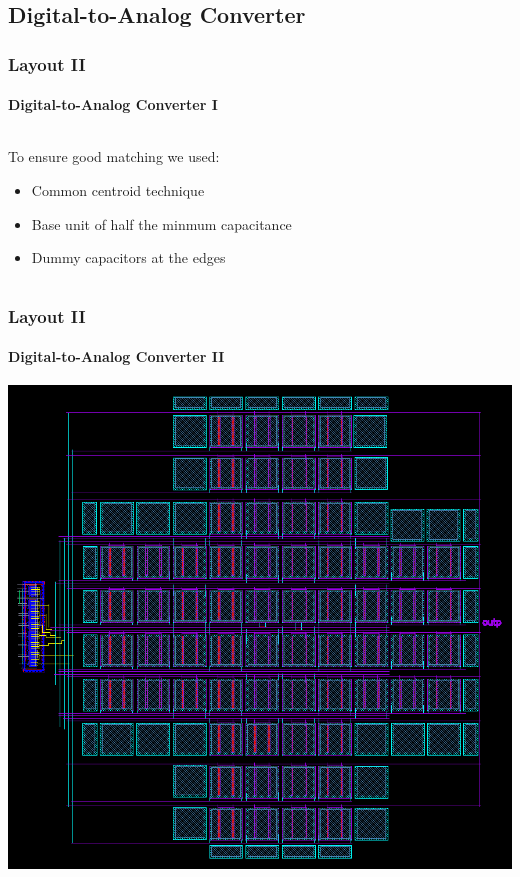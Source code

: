 \documentclass{beamer}
\begin{document}
  \subsection{Digital-to-Analog Converter}
  \begin{frame}
    \frametitle{Layout II}
    \framesubtitle{Digital-to-Analog Converter I}
    \begin{columns}
    \begin{column}{0.40\linewidth}
    To ensure good matching we used: 
    \begin{itemize}
    \item Common centroid technique
    \item<2-> Base unit of half the minmum capacitance
    \item<3-> Dummy capacitors at the edges
    \end{itemize}
    \vspace{3em}
    \end{column}
    \begin{column}{0.60\linewidth}
    \centering
    
    \end{column}
    \end{columns}
  \end{frame}

  \begin{frame}
    \frametitle{Layout II}
    \framesubtitle{Digital-to-Analog Converter II}
    \centering
    \includegraphics[height=.8\textheight]{img/cap_layout}
  \end{frame}
\end{document}
